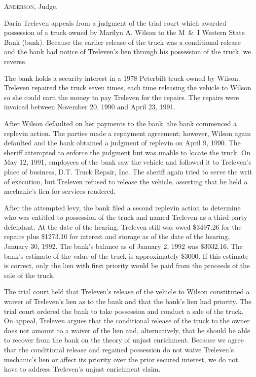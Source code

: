 
\opinion \textsc{Anderson}, Judge.

Darin Treleven appeals from a judgment of the trial court which awarded
possession of a truck owned by Marilyn A. Wilson to the M~\&~I Western State
Bank (bank). Because the earlier release of the truck was a conditional release
and the bank had notice of Treleven's lien through his possession of the truck,
we reverse.

The bank holds a security interest in a 1978 Peterbilt truck owned by Wilson.
Treleven repaired the truck seven times, each time releasing the vehicle to
Wilson so she could earn the money to pay Treleven for the repairs. The repairs
were invoiced between November 20, 1990 and April 23, 1991.

After Wilson defaulted on her payments to the bank, the bank commenced a
replevin action. The parties made a repayment agreement; however, Wilson again
defaulted and the bank obtained a judgment of replevin on April 9, 1990. The
sheriff attempted to enforce the judgment but was unable to locate the truck.
On May 12, 1991, employees of the bank saw the vehicle and followed it to
Treleven's place of business, D.T. Truck Repair, Inc. The sheriff again tried
to serve the writ of execution, but Treleven refused to release the vehicle,
asserting that he held a mechanic's lien for services rendered.

After the attempted levy, the bank filed a second replevin action to determine
who was entitled to possession of the truck and named Treleven as a third-party
defendant. At the date of the hearing, Treleven still was owed \$3497.26 for
the repairs plus \$1273.10 for interest and storage as of the date of the
hearing, January 30, 1992. The bank's balance as of January 2, 1992 was
\$3032.16. The bank's estimate of the value of the truck is approximately
\$3000. If this estimate is correct, only the lien with first priority would be
paid from the proceeds of the sale of the truck.

The trial court held that Treleven's release of the vehicle to Wilson
constituted a waiver of Treleven's lien as to the bank and that the bank's lien
had priority. The trial court ordered the bank to take possession and conduct a
sale of the truck. On appeal, Treleven argues that the conditional release of
the truck to the owner does not amount to a waiver of the lien and,
alternatively, that he should be able to recover from the bank on the theory of
unjust enrichment. Because we agree that the conditional release and regained
possession do not waive Treleven's mechanic's lien or affect its priority over
the prior secured interest, we do not have to address Treleven's unjust
enrichment claim.

